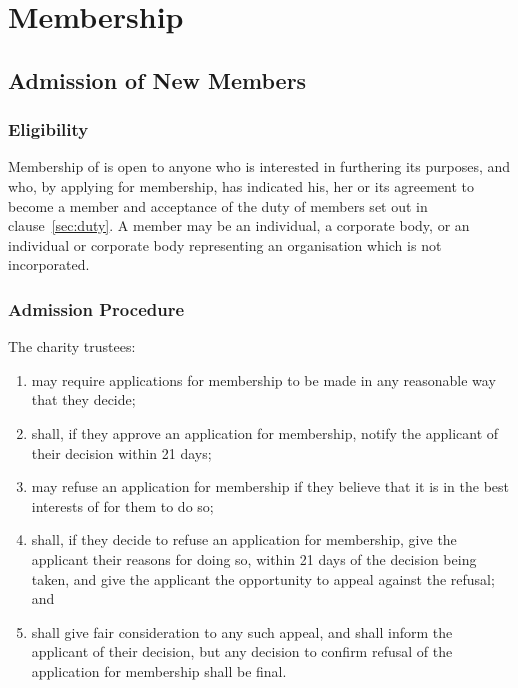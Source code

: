 \section{Membership}\label{sec:membership}

    \subsection{Admission of New Members}\label{sec:admission}

        \subsubsection{Eligibility}\label{sec:eligibility}
        Membership of \shortname{} is open to anyone who is interested in furthering its purposes, and who, by applying for membership, has indicated his, her or its agreement to become a member and acceptance of the duty of members set out in clause~\ref{sec:duty}.
        A member may be an individual, a corporate body, or an individual or corporate body representing an organisation which is not incorporated.

        \subsubsection{Admission Procedure}\label{sec:admission_procedure}
        The charity trustees:
        \begin{enumerate}
            \item may require applications for membership to be made in any reasonable way that they decide;
            \item shall, if they approve an application for membership, notify the applicant of their decision within 21 days;
            \item may refuse an application for membership if they believe that it is in the best interests of \shortname{} for them to do so;
            \item shall, if they decide to refuse an application for membership, give the applicant their reasons for doing so, within 21 days of the decision being taken, and give the applicant the opportunity to appeal against the refusal; and
            \item shall give fair consideration to any such appeal, and shall inform the applicant of their decision, but any decision to confirm refusal of the application for membership shall be  final.
        \end{enumerate}


